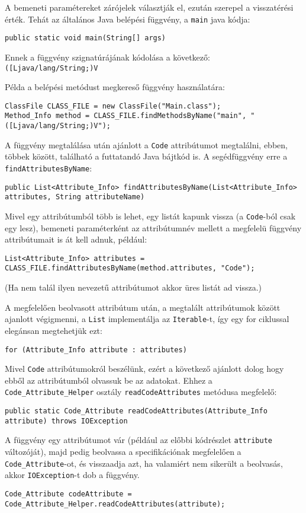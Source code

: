 A bemeneti paramétereket zárójelek választják el, ezután szerepel a visszatérési érték. Tehát az általános Java belépési függvény, a \lstinline{main} java kódja:
\begin{verbatim}
public static void main(String[] args)
\end{verbatim}
Ennek a függvény szignatúrájának kódolása a következő: \lstinline{([Ljava/lang/String;)V}

Példa a belépési metódust megkereső függvény használatára:
\begin{verbatim}
ClassFile CLASS_FILE = new ClassFile("Main.class");
Method_Info method = CLASS_FILE.findMethodsByName("main", "([Ljava/lang/String;)V");
\end{verbatim}

A függvény megtalálása után ajánlott a \lstinline{Code} attribútumot megtalálni, ebben, többek között, található a futtatandó Java bájtkód is. A segédfüggvény erre a \lstinline{findAttributesByName}:
\begin{verbatim}
public List<Attribute_Info> findAttributesByName(List<Attribute_Info> attributes, String attributeName)
\end{verbatim}
Mivel egy attribútumból több is lehet, egy listát kapunk vissza (a \lstinline{Code}-ból csak egy lesz), bemeneti paraméterként az attribútumnév mellett a megfelelü függvény attribútumait is át kell adnuk, például:
\begin{verbatim}
List<Attribute_Info> attributes = CLASS_FILE.findAttributesByName(method.attributes, "Code");
\end{verbatim}
(Ha nem talál ilyen nevezetű attribútumot akkor üres listát ad vissza.)

A megfelelően beolvasott attribútum után, a megtalált attribútumok között ajanlott végigmenni, a \lstinline{List} implementálja az \lstinline{Iterable}-t, így egy for ciklussal elegánsan megtehetjük ezt:
\begin{verbatim}
for (Attribute_Info attribute : attributes)
\end{verbatim}

Mivel \lstinline{Code} attribútumokról beszélünk, ezért a következő ajánlott dolog hogy ebből az attribútumból olvassuk be az adatokat. Ehhez a \lstinline{Code_Attribute_Helper} osztály \lstinline{readCodeAttributes} metódusa megfelelő:
\begin{verbatim}
public static Code_Attribute readCodeAttributes(Attribute_Info attribute) throws IOException
\end{verbatim}
A függvény egy attribútumot vár (például az előbbi kódrészlet \lstinline{attribute} változóját), majd pedig beolvassa a specifikációnak megfelelően a \lstinline{Code_Attribute}-ot, és visszaadja azt, ha valamiért nem sikerült a beolvasás, akkor \lstinline{IOException}-t dob a függvény.
\begin{verbatim}
Code_Attribute codeAttribute = Code_Attribute_Helper.readCodeAttributes(attribute);
\end{verbatim}

